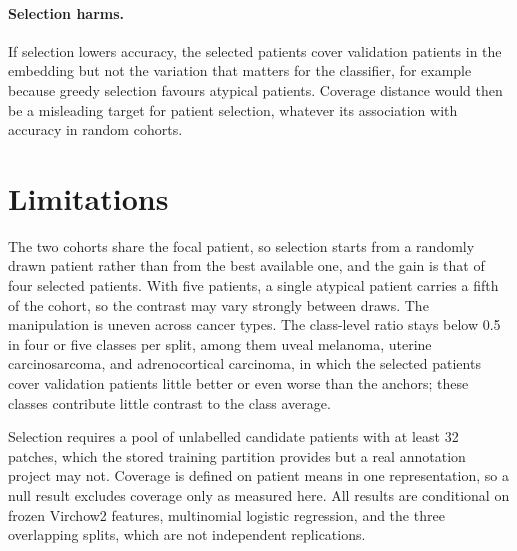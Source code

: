 \documentclass[11pt]{article}
\begin{document}
\paragraph{Selection harms.}
If selection lowers accuracy, the selected patients cover validation patients in the embedding but not the variation that matters for the classifier, for example because greedy selection favours atypical patients. Coverage distance would then be a misleading target for patient selection, whatever its association with accuracy in random cohorts.

\section{Limitations}
\label{sec:limitations}
The two cohorts share the focal patient, so selection starts from a randomly drawn patient rather than from the best available one, and the gain is that of four selected patients. With five patients, a single atypical patient carries a fifth of the cohort, so the contrast may vary strongly between draws. The manipulation is uneven across cancer types. The class-level ratio stays below 0.5 in four or five classes per split, among them uveal melanoma, uterine carcinosarcoma, and adrenocortical carcinoma, in which the selected patients cover validation patients little better or even worse than the anchors; these classes contribute little contrast to the class average.

Selection requires a pool of unlabelled candidate patients with at least 32 patches, which the stored training partition provides but a real annotation project may not. Coverage is defined on patient means in one representation, so a null result excludes coverage only as measured here. All results are conditional on frozen Virchow2 features, multinomial logistic regression, and the three overlapping splits, which are not independent replications.



\end{document}
